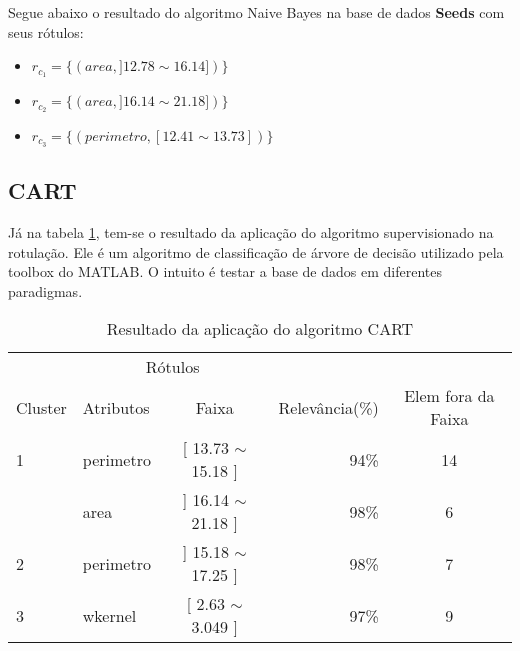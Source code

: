 Segue abaixo o resultado do algoritmo Naive Bayes na base de dados \textbf{Seeds} com seus rótulos: 
\begin{itemize}[noitemsep]
 \item ${r_{c_1}=\{ (area, ]12.78 \sim 16.14]) \} }$  
 \item ${r_{c_2}=\{ (area, ]16.14 \sim 21.18]) \} }$
 \item ${r_{c_3}=\{ (perimetro, [12.41 \sim 13.73])\} }$
\end{itemize}


\subsection{CART}\label{cap:resultados:ssec:seed:cart}


Já na tabela \ref{tab:rot:seeds:cart}, tem-se o resultado da aplicação do algoritmo supervisionado na rotulação. Ele é um algoritmo de classificação de árvore de decisão utilizado pela toolbox do MATLAB. O intuito é testar a base de dados em diferentes paradigmas.

\begin{table}[!h]
\centering
\caption{Resultado da aplicação do algoritmo CART}
\label{tab:rot:seeds:cart}
\begin{tabular}{llcrc}\hline \hline

\multicolumn{1}{c}{\cellcolor[HTML]{FFFFFF}} & \multicolumn{2}{c}{Rótulos}                      & \multicolumn{1}{r}{}            \\ \cline{2-3}
Cluster                                      & Atributos      & \multicolumn{1}{c}{Faixa}       & \multicolumn{1}{c}{Relevância(\%)} & Elem fora da Faixa \\ \hline \hline
1                                            & perimetro      & [ 13.73 $\sim$ 15.18 ]          & 94\%          & 14\\ \hline
                                             & area           & ] 16.14 $\sim$  21.18 ]          & 98\%         & 6 \\ 
\multirow{-2}{*}{2}                          & perimetro      & ] 15.18 $\sim$  17.25 ]          & 98\%         & 7\\  \hline
3                                            & wkernel        & [ 2.63 $\sim$  3.049 ]         & 97\%           & 9\\ \hline \hline
\end{tabular}
\end{table}


